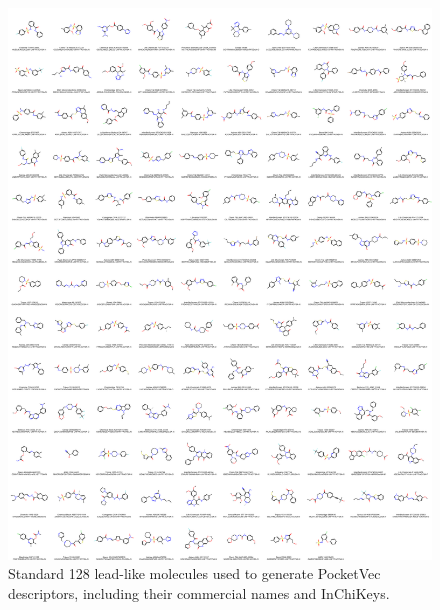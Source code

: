 \begin{figure}[htbp]
  \centering
  \includegraphics[width=0.9\linewidth]{figures/PocketVec/Supplementary/FigS8_v2.png}
  \caption{
  Standard 128 lead-like molecules used to generate PocketVec descriptors, including their commercial names and InChiKeys.
  }
  \label{PocketVec_FigS8_v2}
\end{figure}

